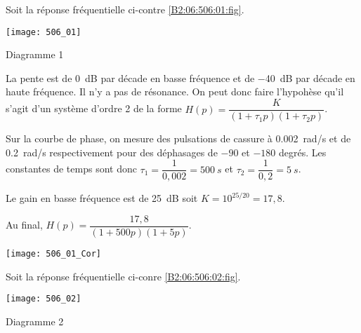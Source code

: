 \normaltrue \difficilefalse \tdifficilefalse
\correctiontrue


\setcounter{question}{0}%

\ifcorrection
\else
{}
\fi


\ifprof 
\else
Soit la réponse fréquentielle ci-contre \ref{B2:06:506:01:fig}.
\begin{marginfigure}
\texttt{[image: 506\_01]}
\caption{Diagramme 1 \label{B2:06:506:01:fig}}
\end{marginfigure}
\fi


\ifprof
La pente est de \SI{0}{dB} par décade en basse fréquence et de \SI{-40}{dB} par décade en haute fréquence. Il n'y a pas de résonance. On peut donc faire l'hypohèse qu'il s'agit d'un système d'ordre 2 de la forme $H(p)=\dfrac{K}{\left( 1+\tau_1 p\right)\left( 1+\tau_2 p\right)}$.


Sur la courbe de phase, on mesure des pulsations de cassure à \SI{0,002}{rad/s} et de \SI{0,2}{rad/s} respectivement pour des déphasages de $-90$ et $-180$ degrés. Les constantes de temps sont donc $\tau_1 =\dfrac{1}{0,002}= \SI{500}{s}$ et $\tau_2 =\dfrac{1}{0,2} = \SI{5}{s}$.

Le gain en basse fréquence est de \SI{25}{dB} soit $K = 10^{25/20}=17,8$.


Au final, $H(p)=\dfrac{17,8}{\left( 1+500 p\right)\left( 1+ 5p\right)}$.

\begin{center}
\texttt{[image: 506\_01\_Cor]}
\end{center}
\else
\fi


\ifprof 
\else
Soit la réponse fréquentielle ci-conre \ref{B2:06:506:02:fig}.
\begin{marginfigure}
\texttt{[image: 506\_02]}
\caption{Diagramme 2 \label{B2:06:506:02:fig}}
\end{marginfigure}
\fi


